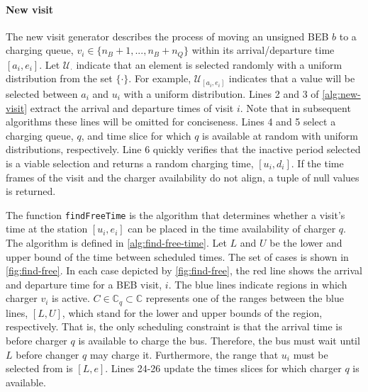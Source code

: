 \documentclass[11pt,a4paper,final]{article}
\newcommand{\C}{\mathbb{C}}                 %
\newcommand{\U}{\mathcal{U}}                %
\begin{document}
\paragraph{New visit}
\label{sec:new-visit}
The new visit generator describes the process of moving an unsigned BEB \(b\) to a charging queue, \(v_i \in \{n_B+1,...,
n_B + n_Q\}\) within its arrival/departure time \([a_i, e_i]\). Let \(\U_{\cdot}\) indicate that an element is selected randomly
with a uniform distribution from the set \(\{\cdot\}\). For example, \(\U_{[a_i, e_i]}\) indicates that a value will be selected
between \(a_i\) and \(u_i\) with a uniform distribution. Lines 2 and 3 of \ref{alg:new-visit} extract the arrival and
departure times of visit \(i\). Note that in subsequent algorithms these lines will be omitted for conciseness. Lines 4
and 5 select a charging queue, \(q\), and time slice for which \(q\) is available at random with uniform distributions,
respectively. Line 6 quickly verifies that the inactive period selected is a viable selection and returns a random
charging time, \([u_i, d_i]\). If the time frames of the visit and the charger availability do not align, a tuple of null
values is returned.

The function \texttt{findFreeTime} is the algorithm that determines whether a visit's time at the station \([u_i, e_i]\) can be
placed in the time availability of charger \(q\). The algorithm is defined in \ref{alg:find-free-time}. Let \(L\) and \(U\) be
the lower and upper bound of the time between scheduled times. The set of cases is shown in \ref{fig:find-free}. In each case
depicted by \ref{fig:find-free}, the red line shows the arrival and departure time for a BEB visit, \(i\). The blue lines
indicate regions in which charger \(v_i\) is active. \(C \in \C_q \subset \C\) represents one of the ranges between the blue lines,
\([L, U]\), which stand for the lower and upper bounds of the region, respectively. That is, the only scheduling
constraint is that the arrival time is before charger \(q\) is available to charge the bus. Therefore, the bus must wait
until \(L\) before changer \(q\) may charge it. Furthermore, the range that \(u_i\) must be selected from is \([L,e]\). Lines
24-26 update the times slices for which charger \(q\) is available.
\end{document}
